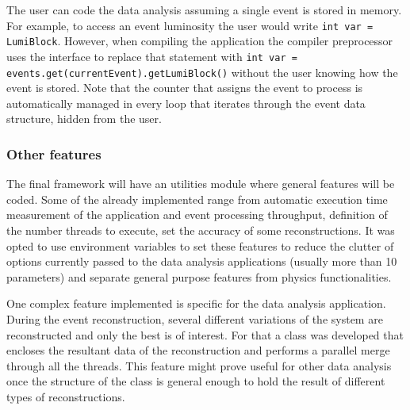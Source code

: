 The user can code the data analysis assuming a single event is stored in memory. For example, to access an event luminosity the user would write \texttt{int var = LumiBlock}. However, when compiling the application the compiler preprocessor uses the interface to replace that statement with \texttt{int var = events.get(currentEvent).getLumiBlock()} without the user knowing how the event is stored. Note that the counter that assigns the event to process is automatically managed in every loop that iterates through the event data structure, hidden from the user.

\subsubsection*{Other features}

The final framework will have an utilities module where general features will be coded. Some of the already implemented range from automatic execution time measurement of the application and event processing throughput, definition of the number threads to execute, set the accuracy of some reconstructions. It was opted to use environment variables to set these features to reduce the clutter of options currently passed to the data analysis applications (usually more than 10 parameters) and separate general purpose features from physics functionalities.

One complex feature implemented is specific for the \ttH data analysis application. During the event reconstruction, several different variations of the system are reconstructed and only the best is of interest. For that a class was developed that encloses the resultant data of the reconstruction and performs a parallel merge through all the threads. This feature might prove useful for other data analysis once the structure of the class is general enough to hold the result of different types of reconstructions.
